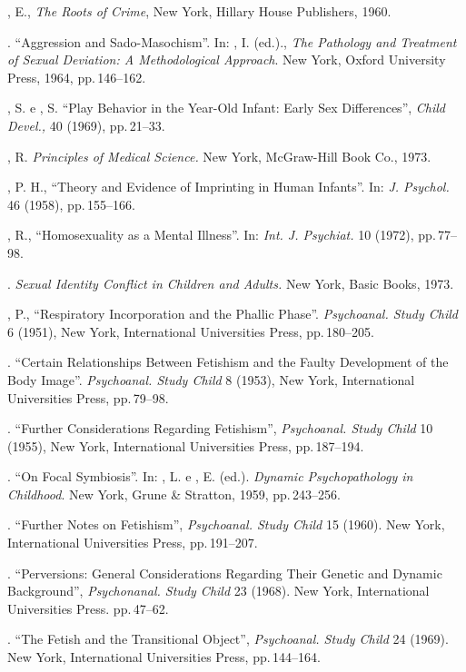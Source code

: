 \begin{bibliohedra}
, E., \textit{The Roots of Crime}, New York, Hillary House Publishers,
1960.

. ``Aggression and Sado-Masochism''. In: , I. (ed.).,
\textit{The Pathology and Treatment of Sexual Deviation: A Methodological
Approach}. New York, Oxford University Press, 1964, pp.\,146--162.

, S. e , S. ``Play Behavior in the Year-Old Infant:
Early Sex Differences'', \textit{Child Devel., }40 (1969), pp.\,21--33.

, R. \textit{Principles of Medical Science.} New York, McGraw-Hill Book
Co., 1973.

, P. H., ``Theory and Evidence of Imprinting in Human
Infants''. In: \textit{J. Psychol.} 46 (1958), pp.\,155--166.

, R., ``Homosexuality as a Mental Illness''. In:
\textit{Int. J. Psychiat. }10 (1972), pp.\,77--98.

. \textit{Sexual Identity Conflict in Children and Adults.} New
York, Basic Books, 1973.

, P., ``Respiratory Incorporation and the Phallic
Phase''. \textit{Psychoanal. Study Child } 6 (1951), New
York, International Universities Press, pp.\,180--205.

. ``Certain Relationships Between Fetishism and the
Faulty Development of the Body Image''. \textit{Psychoanal. Study
Child }8 (1953), New York, International Universities Press, pp.\,79--98.

. ``Further Considerations Regarding
Fetishism'', \textit{Psychoanal. Study Child }10 (1955), New York, 
International Universities Press, pp.\,187--194.

. ``On Focal Symbiosis''. In: , L. e , E. 
(ed.). \textit{Dynamic Psychopathology in Childhood}. New York, 
Grune \& Stratton, 1959, pp.\,243--256.

. ``Further Notes on Fetishism'',
\textit{Psychoanal. Study Child } 15 (1960). New York, International
Universities Press, pp.\,191--207.

. ``Perversions: General Considerations Regarding
Their Genetic and Dynamic Background'', \textit{Psychonanal. Study
Child }23 (1968). New York, International Universities Press. pp.\,47--62.

. ``The Fetish and the Transitional
Object'', \textit{Psychoanal. Study Child } 24 (1969). New York, International 
Universities Press, pp.\,144--164.


\end{bibliohedra}
